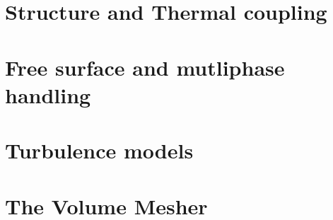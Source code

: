\section{Structure and Thermal coupling}
  \clearpage
  \clearpage
\section{Free surface and mutliphase handling}
  
\clearpage

\section{Turbulence models}
  \clearpage
\section{The Volume Mesher}
   
\clearpage
%
%
\appendix
  \clearpage

